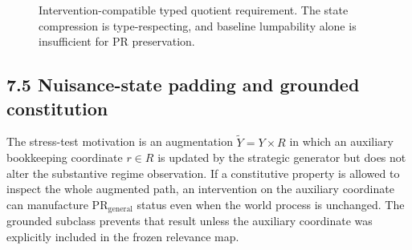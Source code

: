 \documentclass[10pt]{article}
\begin{document}
\begin{figure}[htbp]
\centering
{}
\caption{Intervention-compatible typed quotient requirement. The state compression is type-respecting, and baseline lumpability alone is insufficient for PR preservation.}
\label{fig:quotient-diagram}
\end{figure}

\subsection{7.5 Nuisance-state padding and grounded
constitution}\label{nuisance-state-padding-and-grounded-constitution}

The stress-test motivation is an augmentation \(\ensuremath{\widetilde Y}=Y\times{}R\) in which
an auxiliary bookkeeping coordinate \(r\in{}R\) is updated by the
strategic generator but does not alter the substantive regime
observation. If a constitutive property is allowed to inspect the whole
augmented path, an intervention on the auxiliary coordinate can
manufacture \(\mathrm{PR}_{\mathrm{general}}\) status even when the
world process is unchanged. The grounded subclass prevents that result
unless the auxiliary coordinate was explicitly included in the frozen
relevance map.
\end{document}
